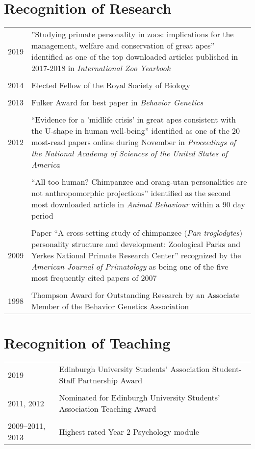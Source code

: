 \documentclass[11pt]{article}
\begin{document}
\section*{Recognition of Research}
\begin{tabular}{p{3cm}p{12cm}}
2019 &  ''Studying primate personality in zoos: implications for the
management, welfare and conservation of great apes'' identified as one
of the top downloaded articles published in 2017-2018 in
\textit{International Zoo Yearbook} \\ \\

2014 & Elected Fellow of the Royal Society of Biology \\ \\

2013 & Fulker Award for best paper in \textit{Behavior Genetics} \\ \\

2012 & ``Evidence for a 'midlife crisis' in great apes consistent with
the U-shape in human well-being'' identified as one of the 20
most-read papers online during November in \textit{Proceedings of the National Academy of
Sciences of the United States of America} \\ \\

& ``All too human? Chimpanzee and orang-utan personalities are
not anthropomorphic projections'' identified as the second most
downloaded article in \textit{Animal Behaviour} within a 90 day period
\\ \\

2009 & Paper ``A cross-setting study of chimpanzee (\textit{Pan
troglodytes}) personality structure and development: Zoological
Parks and Yerkes National Primate Research Center'' recognized by the
\textit{American Journal of Primatology} as being one of the five most
frequently cited papers of 2007 \\ \\

1998 & Thompson Award for Outstanding
Research by an Associate Member of the Behavior Genetics Association
\end{tabular}

\section*{Recognition of Teaching}
\begin{tabular}{p{3cm}p{12cm}}
2019 & Edinburgh University Students' Association Student-Staff
Partnership Award \\ \\

2011, 2012 & Nominated for Edinburgh University Students' Association
Teaching Award \\ \\

2009--2011, 2013 & Highest rated Year 2 Psychology module 
\end{tabular}
\end{document}
